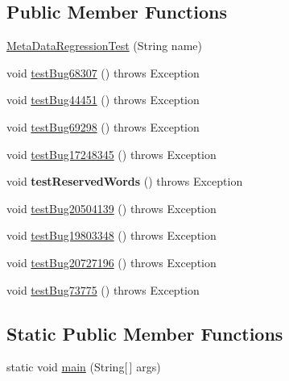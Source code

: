 \subsection*{Public Member Functions}
\begin{DoxyCompactItemize}
\item 
\mbox{\hyperlink{classtestsuite_1_1regression_1_1jdbc4_1_1_meta_data_regression_test_abe172ab0ab4f1ade7d02cd40e7381e18}{Meta\+Data\+Regression\+Test}} (String name)
\item 
void \mbox{\hyperlink{classtestsuite_1_1regression_1_1jdbc4_1_1_meta_data_regression_test_a7b022391fcc7ec9afdfd1e7691d5e730}{test\+Bug68307}} ()  throws Exception 
\item 
void \mbox{\hyperlink{classtestsuite_1_1regression_1_1jdbc4_1_1_meta_data_regression_test_a4208bd802fb2c7e89448921c5e1266a3}{test\+Bug44451}} ()  throws Exception 
\item 
void \mbox{\hyperlink{classtestsuite_1_1regression_1_1jdbc4_1_1_meta_data_regression_test_a2e4de53b0759902efe0dadbb85254323}{test\+Bug69298}} ()  throws Exception 
\item 
void \mbox{\hyperlink{classtestsuite_1_1regression_1_1jdbc4_1_1_meta_data_regression_test_a62673879101557890842d4ab924f62e8}{test\+Bug17248345}} ()  throws Exception 
\item 
\mbox{\label{classtestsuite_1_1regression_1_1jdbc4_1_1_meta_data_regression_test_a5d1ff2e384fe3a02cc565f8041009978}} 
void {\bfseries test\+Reserved\+Words} ()  throws Exception 
\item 
void \mbox{\hyperlink{classtestsuite_1_1regression_1_1jdbc4_1_1_meta_data_regression_test_a04df0e3f36bc701796c1c6168bd10320}{test\+Bug20504139}} ()  throws Exception 
\item 
void \mbox{\hyperlink{classtestsuite_1_1regression_1_1jdbc4_1_1_meta_data_regression_test_a75e07bb9b9aa81d1c849b0cb61a26cf1}{test\+Bug19803348}} ()  throws Exception 
\item 
void \mbox{\hyperlink{classtestsuite_1_1regression_1_1jdbc4_1_1_meta_data_regression_test_a2436308a4107cd00c52ef6460de3d2d3}{test\+Bug20727196}} ()  throws Exception 
\item 
void \mbox{\hyperlink{classtestsuite_1_1regression_1_1jdbc4_1_1_meta_data_regression_test_aa5290e6cea1c9e297a48fe48a53c2b49}{test\+Bug73775}} ()  throws Exception 
\end{DoxyCompactItemize}
\subsection*{Static Public Member Functions}
\begin{DoxyCompactItemize}
\item 
static void \mbox{\hyperlink{classtestsuite_1_1regression_1_1jdbc4_1_1_meta_data_regression_test_ac29bd143a3c244b9fe4457e045c79488}{main}} (String\mbox{[}$\,$\mbox{]} args)
\end{DoxyCompactItemize}
